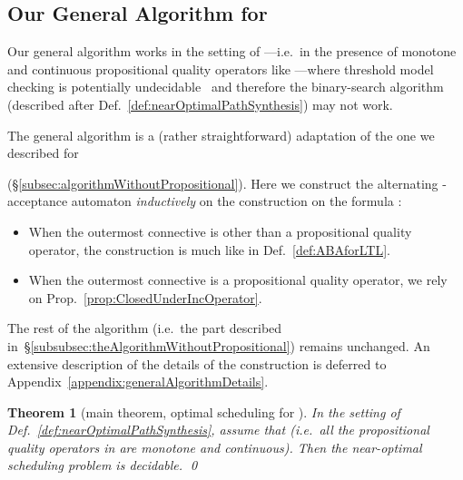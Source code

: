 \documentclass[a4paper,USenglish,numberwithinsect]{lipics}
\newif\ifignore \ignorefalse
\newcommand{\auxproof}[1]{
\ifignore\mbox{}\newline
\textbf{BEGIN: AUX-PROOF} \dotfill\newline
{#1}\mbox{}\newline
\textbf{END: AUX-PROOF}\dotfill\newline
\fi}
\theoremstyle{definition}
\theoremstyle{remark}
\theoremstyle{plain}
\newtheorem{thm}[defi]{Theorem}
\begin{document}
\auxproof{ We can search for a near-worst scheduler, too, by seeking for an optimal
 path for .
}














\subsection{Our General Algorithm for
  }\label{subsec:algorithmWithPropositional}
Our general algorithm works in the setting of ---i.e.\ in
the presence of monotone and continuous propositional quality operators like ---where 
threshold model checking is potentially undecidable~\cite{AlmagorBK14}
and therefore the binary-search algorithm (described after
Def.~\ref{def:nearOptimalPathSynthesis}) may not work. 

The general algorithm is a (rather straightforward)
adaptation of the one we described for

(\S{}\ref{subsec:algorithmWithoutPropositional}). Here
 we construct the 
  alternating -acceptance automaton 
  \emph{inductively} on the construction on the formula :
       \begin{itemize}
	\item When the outermost connective is other than a
	      propositional quality operator, the construction is 
	      much like in Def.~\ref{def:ABAforLTL}.
	\item When the outermost connective is  a
	      propositional quality operator, we rely on
	      Prop.~\ref{prop:ClosedUnderIncOperator}. 
       \end{itemize}
 The rest of the algorithm (i.e.\ the part described
 in~\S{}\ref{subsubsec:theAlgorithmWithoutPropositional}) remains
 unchanged. 
 An extensive description of the details of the construction
 is deferred to Appendix~\ref{appendix:generalAlgorithmDetails}.

\begin{thm}[main theorem, optimal scheduling for ]\label{thm:main}
 In the setting of Def.~\ref{def:nearOptimalPathSynthesis}, 
 assume that  (i.e.\ all the propositional
 quality operators in  are monotone and continuous).
 Then the near-optimal scheduling problem is decidable.
\qed
\end{thm}
\end{document}
